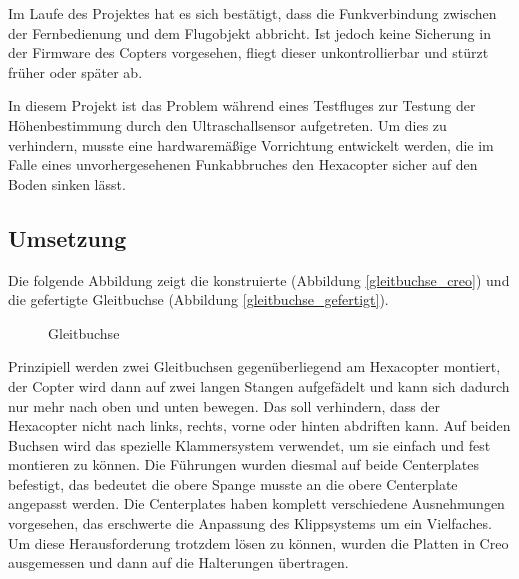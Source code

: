 	Im Laufe des Projektes hat es sich bestätigt, dass die Funkverbindung zwischen der Fernbedienung und dem Flugobjekt abbricht.
	Ist jedoch keine Sicherung in der Firmware des Copters vorgesehen, fliegt dieser unkontrollierbar und stürzt früher oder später ab.

	In diesem Projekt ist das Problem während eines Testfluges zur Testung der Höhenbestimmung durch den Ultraschallsensor aufgetreten.
	Um dies zu verhindern, musste eine hardwaremäßige Vorrichtung entwickelt werden, die im Falle eines unvorhergesehenen Funkabbruches den Hexacopter sicher auf den Boden sinken lässt.

	\subsection{Umsetzung}

	Die folgende Abbildung zeigt die konstruierte (Abbildung \ref{gleitbuchse_creo}) und die gefertigte Gleitbuchse (Abbildung \ref{gleitbuchse_gefertigt}).

			\begin{figure}[tbh]
				\begin{centering}
				\par\end{centering}
				\caption{Gleitbuchse}
				\label{Gleitbuchse}
			\end{figure}

	Prinzipiell werden zwei Gleitbuchsen gegenüberliegend am Hexacopter montiert, der Copter wird dann auf zwei langen Stangen aufgefädelt und kann sich dadurch nur mehr nach oben und unten bewegen.
	Das soll verhindern, dass der Hexacopter nicht nach links, rechts, vorne oder hinten abdriften kann.
	Auf beiden Buchsen wird das spezielle Klammersystem verwendet, um sie einfach und fest montieren zu können.
	Die Führungen wurden diesmal auf beide Centerplates befestigt, das bedeutet die obere Spange musste an die obere Centerplate angepasst werden.
	Die Centerplates haben komplett verschiedene Ausnehmungen vorgesehen, das erschwerte die Anpassung des Klippsystems um ein Vielfaches.
	Um diese Herausforderung trotzdem lösen zu können, wurden die Platten in Creo ausgemessen und dann auf die Halterungen übertragen.


